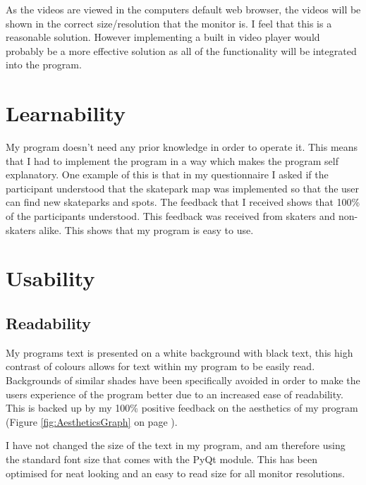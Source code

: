 As the videos are viewed in the computers default web browser, the videos will be shown in the correct size/resolution that the monitor is. I feel that this is a reasonable solution. However implementing a built in video player would probably be a more effective solution as all of the functionality will be integrated into the program. 











\section{Learnability}

My program doesn't need any prior knowledge in order to operate it. This means that I had to implement the program in a way which makes the program self explanatory. One example of this is that in my questionnaire I asked if the participant understood that the skatepark map was implemented so that the user can find new skateparks and spots. The feedback that I received shows that 100\% of the participants understood. This feedback was received from skaters and non-skaters alike. This shows that my program is easy to use.



\section{Usability}

	\subsection{Readability}

My programs text is presented on a white background with black text, this high contrast of colours allows for text within my program to be easily read. Backgrounds of similar shades have been specifically avoided in order to make the users experience of the program better due to an increased ease of readability. This is backed up by my 100\% positive feedback on the aesthetics of my program (Figure \ref{fig:AestheticsGraph} on page \pageref{fig:AestheticsGraph}).

I have not changed the size of the text in my program, and am therefore using the standard font size that comes with the PyQt module. This has been optimised for neat looking and an easy to read size for all monitor resolutions. 

